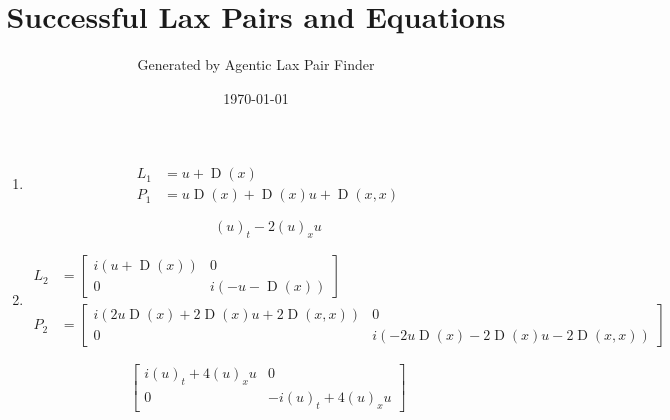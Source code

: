 \documentclass{article}
\begin{document}
\title{Successful Lax Pairs and Equations}
\author{Generated by Agentic Lax Pair Finder}
\date{\today}
\maketitle

\begin{enumerate}

                \item
                \begin{align}
                L_{1} &= u + \operatorname{D}\left(x\right) \\
                P_{1} &= u \operatorname{D}\left(x\right) + \operatorname{D}\left(x\right) u + \operatorname{D}\left(x, x\right)
                \end{align}
                
                \begin{equation}
                (u)_{t} - 2 (u)_{x} u
                \end{equation}
            
                \item
                \begin{align}
                L_{2} &= \left[\begin{matrix}i \left(u + \operatorname{D}\left(x\right)\right) & 0\\0 & i \left(- u - \operatorname{D}\left(x\right)\right)\end{matrix}\right] \\
                P_{2} &= \left[\begin{matrix}i \left(2 u \operatorname{D}\left(x\right) + 2 \operatorname{D}\left(x\right) u + 2 \operatorname{D}\left(x, x\right)\right) & 0\\0 & i \left(- 2 u \operatorname{D}\left(x\right) - 2 \operatorname{D}\left(x\right) u - 2 \operatorname{D}\left(x, x\right)\right)\end{matrix}\right]
                \end{align}
                
                \begin{equation}
                \left[\begin{matrix}i (u)_{t} + 4 (u)_{x} u & 0\\0 & - i (u)_{t} + 4 (u)_{x} u\end{matrix}\right]
                \end{equation}
            

\end{enumerate}
\end{document}
